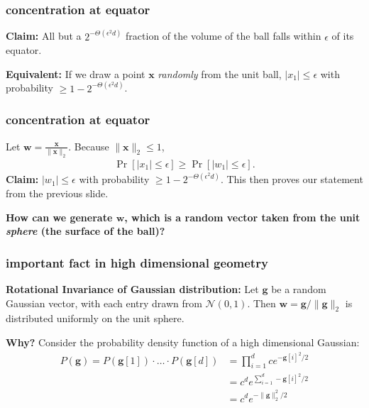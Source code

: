 \documentclass[compress]{beamer}
\newcommand{\bv}[1]{\mathbf{#1}}
\begin{document}
\begin{frame}[t]
	\frametitle{concentration at equator}
	\textbf{Claim:} All but a $2^{-\Theta(\epsilon^2 d)}$ fraction of the volume of the ball falls within $\epsilon$ of its equator. 
		
	\textbf{Equivalent:} If we draw a point $\bv{x}$ \emph{randomly} from the unit ball, $|x_1| \leq \epsilon$ with probability $\geq 1 - {2}^{-\Theta(\epsilon^2 d)}$. 
\end{frame}

\begin{frame}[t]
	\frametitle{concentration at equator}
	Let $\bv{w} = \frac{\bv{x}}{\|\bv{x}\|_2}$. Because $\|\bv{x}\|_2 \leq 1$,
\begin{align*}
\Pr\left[|x_1| \leq \epsilon\right] \geq \Pr\left[|w_1| \leq \epsilon\right].
\end{align*}
	\textbf{Claim:} $|w_1| \leq \epsilon$ with probability $\geq 1 - 2^{-\Theta(\epsilon^2 d)}$. This then proves our statement from the previous slide.
	\vspace{8em}

\alert{\textbf{How can we generate $\bv{w}$, which is a random vector taken from the unit \emph{sphere} (the surface of the ball)?}}
\end{frame}

\begin{frame}[t]
	\frametitle{important fact in high dimensional geometry}
	\textbf{Rotational Invariance of Gaussian distribution:}
	Let $\textbf{g}$ be a random Gaussian vector, with each entry drawn from $\mathcal{N}(0,1)$. Then $\bv{w} = \bv{g}/\|\bv{g}\|_2$ is distributed uniformly on the unit sphere. 
	
	\textbf{Why?} Consider the probability density function of a high dimensional Gaussian:
	\begin{align*}
		P(\bv{g}) = P(\bv{g}[1])\cdot \ldots \cdot P(\bv{g}[d]) &= \prod_{i=1}^d ce^{-\bv{g}[i]^2/2}\\ &= c^d e^{\sum_{i=1}^d -\bv{g}[i]^2/2} \\
		&= c^d e^{-\|\bv{g}\|_2^2/2}
	\end{align*}
	
\end{frame}
\end{document}
